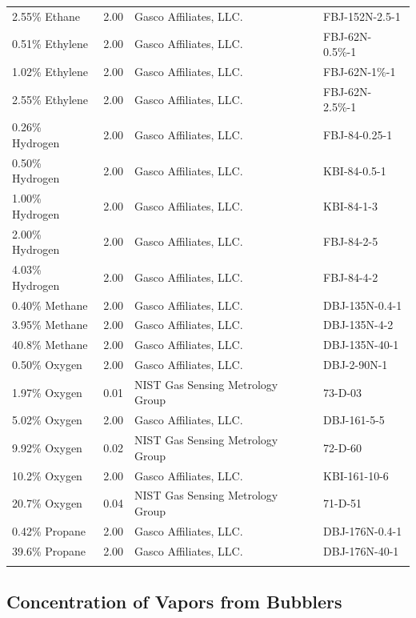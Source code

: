 \documentclass[12pt]{article}
\begin{document}
\begin{table}[h!]
\begin{tabular}{lcll}
2.55\% Ethane			&	2.00	&	Gasco Affiliates, LLC.		&	FBJ-152N-2.5-1		\\
0.51\% Ethylene			&	2.00	&	Gasco Affiliates, LLC.		&	FBJ-62N-0.5\%-1		\\
1.02\% Ethylene			&	2.00	&	Gasco Affiliates, LLC.		&	FBJ-62N-1\%-1		\\
2.55\% Ethylene			&	2.00	&	Gasco Affiliates, LLC.		&	FBJ-62N-2.5\%-1		\\
0.26\% Hydrogen		&	2.00	&	Gasco Affiliates, LLC.		&	FBJ-84-0.25-1		\\
0.50\% Hydrogen		&	2.00	&	Gasco Affiliates, LLC.		&	KBI-84-0.5-1		\\
1.00\% Hydrogen		&	2.00	&	Gasco Affiliates, LLC.		&	KBI-84-1-3		\\
2.00\% Hydrogen		&	2.00	&	Gasco Affiliates, LLC.		&	FBJ-84-2-5		\\
4.03\% Hydrogen		&	2.00	&	Gasco Affiliates, LLC.		&	FBJ-84-4-2		\\
0.40\% Methane			&	2.00	&	Gasco Affiliates, LLC. 		&	DBJ-135N-0.4-1		\\
3.95\% Methane			&	2.00	&	Gasco Affiliates, LLC.		&	DBJ-135N-4-2		\\
40.8\% Methane			&	2.00	&	Gasco Affiliates, LLC.		&	DBJ-135N-40-1		\\
0.50\% Oxygen			&	2.00	&	Gasco Affiliates, LLC. 		&	DBJ-2-90N-1		\\
1.97\% Oxygen			&	0.01	&	NIST Gas Sensing Metrology Group		&	73-D-03		\\
5.02\% Oxygen			&	2.00	&	Gasco Affiliates, LLC.		&	DBJ-161-5-5		\\
9.92\% Oxygen			&	0.02	&	NIST Gas Sensing Metrology Group		&	72-D-60		\\
10.2\% Oxygen			&	2.00	&	Gasco Affiliates, LLC. 		&	KBI-161-10-6		\\
20.7\% Oxygen			&	0.04	&	NIST Gas Sensing Metrology Group		&	71-D-51		\\
0.42\% Propane			&	2.00	&	Gasco Affiliates, LLC.		&	DBJ-176N-0.4-1		\\
39.6\% Propane			&	2.00	&	Gasco Affiliates, LLC. 		&	DBJ-176N-40-1		\\

\\[0.005cm]
\hline
\end{tabular}
\end{table}

\pagebreak
\subsection{Concentration of Vapors from Bubblers}
\label{sssec:Concentration of Vapors from Bubblers}
\end{document}
